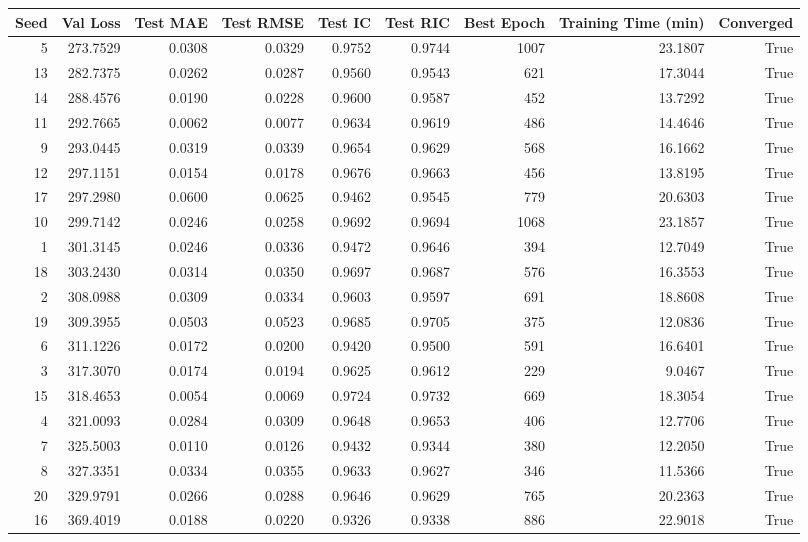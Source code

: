 \begin{tabular}{rrrrrrrrr}
\toprule
Seed & Val Loss & Test MAE & Test RMSE & Test IC & Test RIC & Best Epoch & Training Time (min) & Converged \\
\midrule
5 & 273.7529 & 0.0308 & 0.0329 & 0.9752 & 0.9744 & 1007 & 23.1807 & True \\
13 & 282.7375 & 0.0262 & 0.0287 & 0.9560 & 0.9543 & 621 & 17.3044 & True \\
14 & 288.4576 & 0.0190 & 0.0228 & 0.9600 & 0.9587 & 452 & 13.7292 & True \\
11 & 292.7665 & 0.0062 & 0.0077 & 0.9634 & 0.9619 & 486 & 14.4646 & True \\
9 & 293.0445 & 0.0319 & 0.0339 & 0.9654 & 0.9629 & 568 & 16.1662 & True \\
12 & 297.1151 & 0.0154 & 0.0178 & 0.9676 & 0.9663 & 456 & 13.8195 & True \\
17 & 297.2980 & 0.0600 & 0.0625 & 0.9462 & 0.9545 & 779 & 20.6303 & True \\
10 & 299.7142 & 0.0246 & 0.0258 & 0.9692 & 0.9694 & 1068 & 23.1857 & True \\
1 & 301.3145 & 0.0246 & 0.0336 & 0.9472 & 0.9646 & 394 & 12.7049 & True \\
18 & 303.2430 & 0.0314 & 0.0350 & 0.9697 & 0.9687 & 576 & 16.3553 & True \\
2 & 308.0988 & 0.0309 & 0.0334 & 0.9603 & 0.9597 & 691 & 18.8608 & True \\
19 & 309.3955 & 0.0503 & 0.0523 & 0.9685 & 0.9705 & 375 & 12.0836 & True \\
6 & 311.1226 & 0.0172 & 0.0200 & 0.9420 & 0.9500 & 591 & 16.6401 & True \\
3 & 317.3070 & 0.0174 & 0.0194 & 0.9625 & 0.9612 & 229 & 9.0467 & True \\
15 & 318.4653 & 0.0054 & 0.0069 & 0.9724 & 0.9732 & 669 & 18.3054 & True \\
4 & 321.0093 & 0.0284 & 0.0309 & 0.9648 & 0.9653 & 406 & 12.7706 & True \\
7 & 325.5003 & 0.0110 & 0.0126 & 0.9432 & 0.9344 & 380 & 12.2050 & True \\
8 & 327.3351 & 0.0334 & 0.0355 & 0.9633 & 0.9627 & 346 & 11.5366 & True \\
20 & 329.9791 & 0.0266 & 0.0288 & 0.9646 & 0.9629 & 765 & 20.2363 & True \\
16 & 369.4019 & 0.0188 & 0.0220 & 0.9326 & 0.9338 & 886 & 22.9018 & True \\
\bottomrule
\end{tabular}
